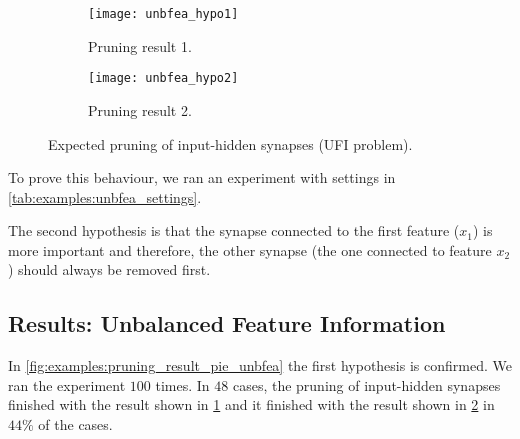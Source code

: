 \begin{figure}[H]
\centering
\begin{subfigure}{.4\textwidth}
  \centering
  \texttt{[image: unbfea\_hypo1]}
  \caption{Pruning result 1.}
  \label{fig:examples:unbfea_hypo1}
\end{subfigure}
\begin{subfigure}{.4\textwidth}
  \centering
  \texttt{[image: unbfea\_hypo2]}
  \caption{Pruning result 2.}
  \label{fig:examples:unbfea_hypo2}
\end{subfigure}
\caption{Expected pruning of input-hidden synapses (UFI problem).}
\label{fig:examples:unbfea_hypos}
\end{figure}

To prove this behaviour, we ran an experiment with settings in \cref{tab:examples:unbfea_settings}.

\begin{table}[H]
\centering
{}
\caption{Experiment settings for the UFI example.}
\label{tab:examples:unbfea_settings}
\end{table}

The second hypothesis is that the synapse connected to the first feature ($ x_1 $) is more important and therefore, the other synapse (the one connected to feature $ x_2 $) should always be removed first.

\subsection*{Results: Unbalanced Feature Information}
In \cref{fig:examples:pruning_result_pie_unbfea} the first hypothesis is confirmed. We ran the experiment $ 100 $ times. In $ 48 $ cases, the pruning of input-hidden synapses finished with the result shown in \cref{fig:examples:unbfea_hypo1} and it finished with the result shown in \cref{fig:examples:unbfea_hypo2} in $ 44\% $ of the cases.

